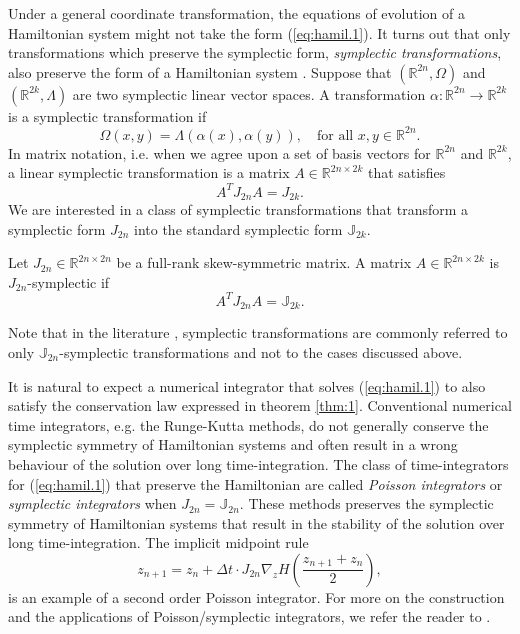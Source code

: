 Under a general coordinate transformation, the equations of evolution of a Hamiltonian system might not take the form (\ref{eq:hamil.1}). It turns out that only transformations which preserve the symplectic form, \emph{symplectic transformations}, also preserve the form of a Hamiltonian system \cite{Hairer:1250576}. Suppose that $(\mathbb R^{2n},\Omega)$ and $(\mathbb R^{2k},\Lambda)$ are two symplectic linear vector spaces. A transformation $\alpha:\mathbb R^{2n}\to\mathbb R^{2k}$ is a symplectic transformation if
\begin{equation} \label{eq:hamil.3}
	\Omega(x,y) = \Lambda(\alpha(x),\alpha(y)), \quad \text{for all } x,y\in\mathbb R^{2n}.
\end{equation}
In matrix notation, i.e. when we agree upon a set of basis vectors for $\mathbb R^{2n}$ and $\mathbb R^{2k}$, a linear symplectic transformation is a matrix $A\in \mathbb R^{2n\times 2k}$ that satisfies
\begin{equation} \label{eq:hamil.4}
	A^T J_{2n} A = J_{2k}.
\end{equation}
We are interested in a class of symplectic transformations that transform a symplectic form $J_{2n}$ into the standard symplectic form $\mathbb J_{2k}$.
\begin{definition}
Let $J_{2n}\in \mathbb R^{2n\times 2n}$ be a full-rank skew-symmetric matrix. A matrix $A\in\mathbb R^{2n\times 2k}$ is $J_{2n}$-symplectic if
\begin{equation} \label{eq:hamil.5}
A^T J_{2n} A = \mathbb{J}_{2k}.
\end{equation}
\end{definition}
Note that in the literature \cite{Marsden:2010:IMS:1965128,Hairer:1250576}, symplectic transformations are commonly referred to only $\mathbb J_{2n}$-symplectic transformations and not to the cases discussed above.

It is natural to expect a numerical integrator that solves (\ref{eq:hamil.1}) to also satisfy the conservation law expressed in theorem \ref{thm:1}. Conventional numerical time integrators, e.g. the Runge-Kutta methods, do not generally conserve the symplectic symmetry of Hamiltonian systems and often result in a wrong behaviour of the solution over long time-integration. The class of time-integrators for (\ref{eq:hamil.1}) that preserve the Hamiltonian are called \emph{Poisson integrators} or \emph{symplectic integrators} when $J_{2n} = \mathbb J_{2n}$. These methods preserves the symplectic symmetry of Hamiltonian systems that result in the stability of the solution over long time-integration. The implicit midpoint rule
\begin{equation}
	z_{n+1} = z_{n} + \Delta t \cdot J_{2n} \nabla_z H( \frac{z_{n+1} + z_n}{2} ),
\end{equation}
is an example of a second order Poisson integrator. For more on the construction and the applications of Poisson/symplectic integrators, we refer the reader to \cite{Hairer:1250576}. 
